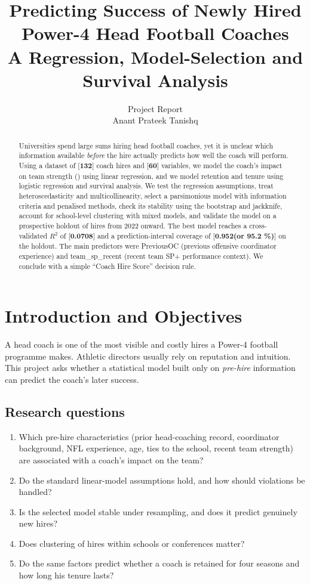 \documentclass[9pt,a4paper]{article}
\title{\textbf{Predicting Success of Newly Hired Power-4 Head Football Coaches}\\[4pt]
\large A Regression, Model-Selection and Survival Analysis}
\author{Project Report\\[2pt] {Anant Prateek Tanishq}}
\date{}
\newcommand{\var}[1]{\texttt{\detokenize{#1}}}
\newcommand{\ph}[1]{\textcolor{red!70!black}{[\textbf{#1}]}}
\begin{document}
\maketitle
\thispagestyle{empty}

\begin{abstract}
Universities spend large sums hiring head football coaches, yet it is unclear which information available \emph{before} the hire actually predicts how well the coach will perform. Using a dataset of \ph{132} coach hires and \ph{60} variables, we model the coach's impact on team strength (\var{sp_rel_team}) using linear regression, and we model retention and tenure using logistic regression and survival analysis. We test the regression assumptions, treat heteroscedasticity and multicollinearity, select a parsimonious model with information criteria and penalised methods, check its stability using the bootstrap and jackknife, account for school-level clustering with mixed models, and validate the model on a prospective holdout of hires from 2022 onward. The best model reaches a cross-validated $R^2$ of \ph{0.0708} and a prediction-interval coverage of \ph{0.952(or 95.2 \%)} on the holdout. The main predictors were PreviousOC (previous offensive coordinator experience) and team\_sp\_recent (recent team SP+ performance context). We conclude with a simple ``Coach Hire Score'' decision rule.
\end{abstract}

\section{Introduction and Objectives}
A head coach is one of the most visible and costly hires a Power-4 football programme makes. Athletic directors usually rely on reputation and intuition. This project asks whether a statistical model built only on \emph{pre-hire} information can predict the coach's later success.

\subsection{Research questions}
\begin{enumerate}[label=\textbf{Q\arabic*.}]
  \item Which pre-hire characteristics (prior head-coaching record, coordinator background, NFL experience, age, ties to the school, recent team strength) are associated with a coach's impact on the team?
  \item Do the standard linear-model assumptions hold, and how should violations be handled?
  \item Is the selected model stable under resampling, and does it predict genuinely new hires?
  \item Does clustering of hires within schools or conferences matter?
  \item Do the same factors predict whether a coach is retained for four seasons and how long his tenure lasts?
\end{enumerate}
\end{document}
